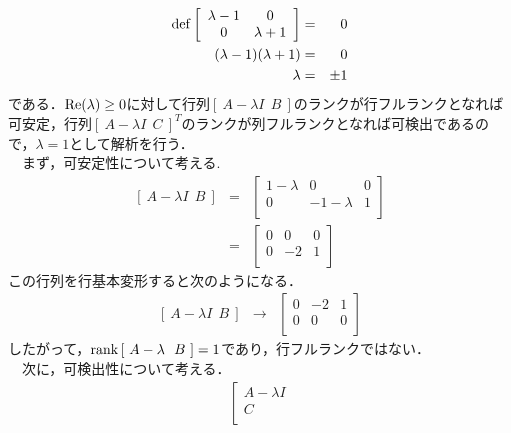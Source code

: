 \documentclass[a4paper,11pt]{jarticle}
\begin{document}
\begin{enumerate}
\begin{enumerate}[(1)]
\begin{eqnarray*}
	  {\rm def} \left[
		    \begin{array}{cc}
		     \lambda - 1 & 0 \\
		     0 & \lambda +1 \\
		    \end{array}
		    \right] & = & 0\\
	  ( \lambda -1 )( \lambda +1 ) & = & 0\\
	  \lambda & = & \pm1
	 \end{eqnarray*}
	 である．$ {\rm Re}( \lambda ) \geq 0 $に対して行列$ \left[ ~ A - \lambda I ~~ B ~\right] $のランクが行フルランクとなれば可安定，行列$ \left[ ~ A - \lambda I ~~ C ~\right]^T $のランクが列フルランクとなれば可検出であるので，$ \lambda = 1 $として解析を行う．\\
	 \ \ まず，可安定性について考える.
	 \begin{eqnarray*}
	  \left[ ~ A - \lambda I ~~ B ~ \right] & = & \left[
						  \begin{array}{ccc}
						   1 - \lambda & 0 & 0\\
						   0 & -1-\lambda & 1\\
						  \end{array}
						  \right]\\
	                                        & = & \left[
						      \begin{array}{ccc}
						       0 & 0 & 0 \\
						       0 & -2 & 1 \\
						      \end{array}\right]
	 \end{eqnarray*}
	 この行列を行基本変形すると次のようになる．
	 \begin{eqnarray*}
	  \left[ ~ A - \lambda I ~~ B ~ \right] & → & \left[
						      \begin{array}{ccc}
						       0 & -2 & 1 \\
						       0 & 0 & 0 \\
						      \end{array}\right]
	 \end{eqnarray*}
	 したがって，$ {\rm rank} \left[ ~ A - \lambda ~~ B ~ \right] = 1 $であり，行フルランクではない．\\
	 \ \ 次に，可検出性について考える．
	 \begin{eqnarray*}
	  \left[
	  \begin{array}{c}
	   A - \lambda I \\
	   C \\
	  \end{array}

\end{eqnarray*}
\end{enumerate}
\end{enumerate}
\end{document}

